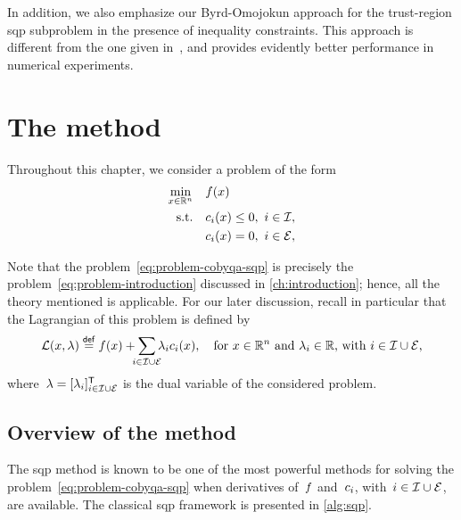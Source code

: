 In addition, we also emphasize our Byrd-Omojokun approach for the trust-region \gls{sqp} subproblem in the presence of inequality constraints.
This approach is different from the one given in~\cite[\S~15.4.4]{Conn_Gould_Toint_2000}, and provides evidently better performance in numerical experiments.

\section{The method}
\label{sec:sqp-method}

Throughout this chapter, we consider a problem of the form
\begin{subequations}
    \label{eq:problem-cobyqa-sqp}
    \begin{align}
        \min_{\iter \in \R^n}   & \quad \obj(\iter) \label{eq:problem-cobyqa-sqp-obj}\\
        \text{s.t.}             & \quad \con{i}(\iter) \le 0, ~ i \in \iub, \label{eq:problem-cobyqa-sqp-ub}\\
                                & \quad \con{i}(\iter) = 0, ~ i \in \ieq, \label{eq:problem-cobyqa-sqp-eq}
    \end{align}
\end{subequations}

Note that the problem~\cref{eq:problem-cobyqa-sqp} is precisely the problem~\cref{eq:problem-introduction} discussed in \cref{ch:introduction}; hence, all the theory mentioned is applicable.
For our later discussion, recall in particular that the Lagrangian of this problem is defined by
\begin{equation*}
    \lag(\iter, \lm) \eqdef \obj(\iter) + \sum_{\mathclap{i \in \iub \cup \ieq}} \lm_i \con{i}(\iter), \quad \text{for~$\iter \in \R^n$ and~$\lm_i \in \R$, with~$i \in \iub \cup \ieq$,}
\end{equation*}
where~$\lm = [\lm_i]_{i \in \iub \cup \ieq}^{\T}$ is the dual variable of the considered problem.

\subsection{Overview of the method}

The \gls{sqp} method is known to be one of the most powerful methods for solving the problem~\cref{eq:problem-cobyqa-sqp} when derivatives of~$f$ and~$c_{i}$, with~$i \in \mathcal{I} \cup \mathcal{E}$, are available.
The classical \gls{sqp} framework is presented in \cref{alg:sqp}.

